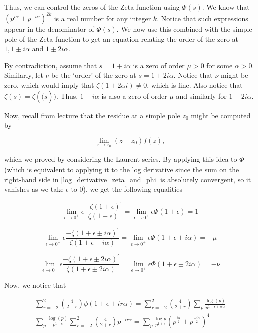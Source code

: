 \documentclass{article}
\theoremstyle{definition}
\begin{document}
Thus, we can control the zeros of the Zeta function using $ \Phi(s) $. We know that $ (p^{i \alpha} + p^{-i \alpha})^{2k} $
is a real number for any integer $ k $. Notice that such expressions appear in the denominator
of $ \Phi(s) $. We now use this combined with the simple pole of the Zeta function to get
an equation relating the order of the zero at $ 1, 1 \pm i \alpha $ and $ 1 \pm 2i \alpha $.

By contradiction, assume that $ s = 1 + i \alpha $ is a zero of order $ \mu > 0 $
for some $ \alpha > 0 $. Similarly, let $ \nu $ be the `order' of the zero at 
$ s = 1 + 2i \alpha $. Notice that $ \nu $ might be zero, which would imply
that $ \zeta(1 + 2 \alpha i) \neq 0 $, which is fine. Also notice that $ \bar{\zeta(s)} = \zeta(\bar(s)) $.
Thus, $ 1 - i \alpha $ is also a zero of order $ \mu $ and similarly for $ 1 - 2 i \alpha $.

Now, recall from lecture that the residue at a simple pole $ z_{0} $
might be computed by 

\[ \lim_{z \to z_{0}} (z - z_{0})f(z), \]

which we proved by considering the Laurent series. By applying this idea to $ \Phi $ 
(which is equivalent to applying it to the log derivative since the sum 
on the right-hand side in \ref{log_derivative_zeta_and_phi} is absolutely convergent, so it vanishes as we take $ \epsilon $ to 0), we get the following equalities

\[ \lim_{\epsilon \to 0^{+}} \epsilon  \frac{-\zeta(1 + \epsilon)^{\prime}}{\zeta(1 + \epsilon)}  = \lim_{\epsilon \to 0^{+}}  \epsilon \Phi(1 + \epsilon) = 1 \]

\[ \lim_{\epsilon \to 0^{+}} \epsilon  \frac{-\zeta(1 + \epsilon \pm i\alpha)^{\prime}}{\zeta(1 + \epsilon \pm i\alpha)}  = \lim_{\epsilon \to 0^{+}} \epsilon \Phi(1 + \epsilon \pm i\alpha) = - \mu \]

\[ \lim_{\epsilon \to 0^{+}} \epsilon  \frac{-\zeta(1 + \epsilon \pm 2i\alpha)^{\prime}}{\zeta(1 + \epsilon \pm 2i\alpha)} = \lim_{\epsilon \to 0^{+}} \epsilon \Phi(1 + \epsilon \pm 2i\alpha) = - \nu \]

Now, we notice that 

\begin{align*}
    \sum_{r = - 2}^{2} \binom{4}{2 + r} \phi(1 + \epsilon + ir \alpha) = \sum_{r = - 2}^{2} \binom{4}{2 + r} \sum_{p} \frac{\log (p)}{p^{1 + \epsilon + ir \alpha}} \\
    \sum_{p} \frac{\log (p)}{p^{1 + \epsilon}} \sum_{r = - 2}^{2} \binom{4}{2 + r} p^{-ir \alpha} = 
    \sum_{p} \frac{\log p}{p^{1 + \epsilon}} (p^{\frac{i \alpha}{2}} + p^{\frac{- i \alpha}{2}})^{4}
\end{align*}
\end{document}
